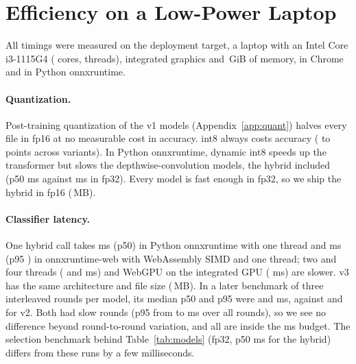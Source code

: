 \section{Efficiency on a Low-Power Laptop}
\label{sec:efficiency}

All timings were measured on the deployment target, a laptop with an Intel Core i3-1115G4
( cores,  threads), integrated graphics and \,GiB of memory,
in Chrome  and in Python onnxruntime.

\paragraph{Quantization.}
Post-training quantization of the v1 models (Appendix~\ref{app:quant})
\citep{jacob2018quantization,nagel2021whitepaper} halves every file in fp16 at no measurable cost
in accuracy. int8 always costs accuracy ( to  points across
variants). In Python onnxruntime, dynamic int8 speeds up the transformer but slows the
depthwise-convolution models, the hybrid included (p50  ms against
 ms in fp32). Every model is fast enough in fp32, so we ship the hybrid in fp16
(\,MB).

\paragraph{Classifier latency.}
One hybrid call takes  ms (p50) in Python onnxruntime with one thread and
 ms (p95 ) in onnxruntime-web with WebAssembly SIMD and one thread;
two and four threads ( and  ms) and WebGPU on the integrated GPU
( ms) are slower. v3 has the same architecture and file size (\,MB).
In a later benchmark of three interleaved rounds per model, its median p50 and p95 were
 and  ms, against  and  for v2. Both had
slow rounds (p95 from  to  ms over all rounds), so we see no difference
beyond round-to-round variation, and all are inside the  ms budget. The selection
benchmark behind Table~\ref{tab:models} (fp32, p50  ms for the hybrid) differs from
these runs by a few milliseconds.

